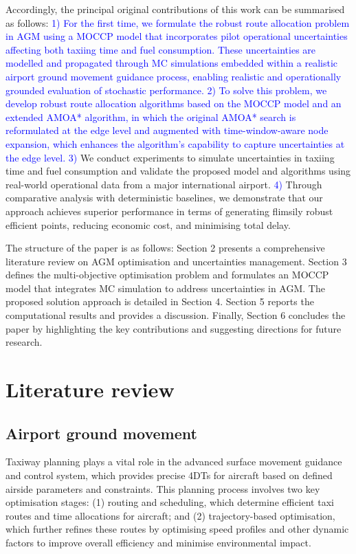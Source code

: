 \documentclass{article}
\newcommand*{\blue}{\textcolor{blue}}
\begin{document}
Accordingly, the principal original contributions of this work can be summarised as follows: \blue{1) For the first time, we formulate the robust route allocation problem in AGM using a MOCCP model that incorporates pilot operational uncertainties affecting both taxiing time and fuel consumption. These uncertainties are modelled and propagated through MC simulations embedded within a realistic airport ground movement guidance process, enabling realistic and operationally grounded evaluation of stochastic performance.
2) To solve this problem, we develop robust route allocation algorithms based on the MOCCP model and an extended AMOA* algorithm, in which the original AMOA* search is reformulated at the edge level and augmented with time-window-aware node expansion, which enhances the algorithm’s capability to capture uncertainties at the edge level.} \blue{3)} We conduct experiments to simulate uncertainties in taxiing time and fuel consumption and validate the proposed model and algorithms using real-world operational data from a major international airport. \blue{4)} Through comparative analysis with deterministic baselines, we demonstrate that our approach achieves superior performance in terms of generating flimsily robust efficient points, reducing economic cost, and minimising total delay.

The structure of the paper is as follows: Section 2 presents a comprehensive literature review on AGM optimisation and uncertainties management. Section 3 defines the multi-objective optimisation problem and formulates an MOCCP model that integrates MC simulation to address uncertainties in AGM. The proposed solution approach is detailed in Section 4. Section 5 reports the computational results and provides a discussion. Finally, Section 6 concludes the paper by highlighting the key contributions and suggesting directions for future research.


\section{Literature review}

\subsection{Airport ground movement}
Taxiway planning plays a vital role in the advanced surface movement guidance and control system, which provides precise 4DTs for aircraft based on defined airside parameters and constraints. This planning process involves two key optimisation stages: (1) routing and scheduling, which determine efficient taxi routes and time allocations for aircraft; and (2) trajectory-based optimisation, which further refines these routes by optimising speed profiles and other dynamic factors to improve overall efficiency and minimise environmental impact.
\end{document}
